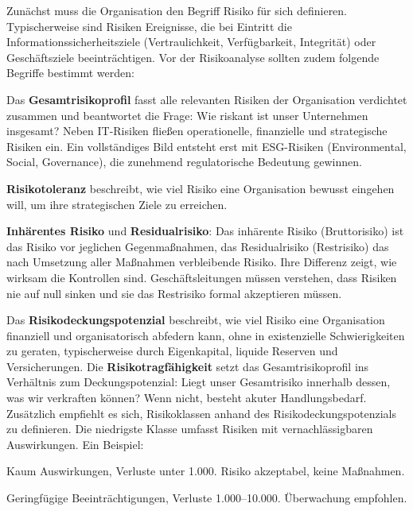 Zunächst muss die Organisation den Begriff Risiko für sich definieren. Typischerweise sind Risiken Ereignisse, die bei Eintritt die Informationssicherheitsziele (Vertraulichkeit, Verfügbarkeit, Integrität) oder Geschäftsziele beeinträchtigen. Vor der Risikoanalyse sollten zudem folgende Begriffe bestimmt werden:

Das \textbf{Gesamtrisikoprofil} fasst alle relevanten Risiken der Organisation verdichtet zusammen und beantwortet die Frage: Wie riskant ist unser Unternehmen insgesamt? Neben IT-Risiken fließen operationelle, finanzielle und strategische Risiken ein. Ein vollständiges Bild entsteht erst mit ESG-Risiken (Environmental, Social, Governance), die zunehmend regulatorische Bedeutung gewinnen.

\textbf{Risikotoleranz} beschreibt, wie viel Risiko eine Organisation bewusst eingehen will, um ihre strategischen Ziele zu erreichen.

\textbf{Inhärentes Risiko} und \textbf{Residualrisiko}: Das inhärente Risiko (Bruttorisiko) ist das Risiko vor jeglichen Gegenmaßnahmen, das Residualrisiko (Restrisiko) das nach Umsetzung aller Maßnahmen verbleibende Risiko. Ihre Differenz zeigt, wie wirksam die Kontrollen sind. Geschäftsleitungen müssen verstehen, dass Risiken nie auf null sinken und sie das Restrisiko formal akzeptieren müssen.

Das \textbf{Risikodeckungspotenzial} beschreibt, wie viel Risiko eine Organisation finanziell und organisatorisch abfedern kann, ohne in existenzielle Schwierigkeiten zu geraten, typischerweise durch Eigenkapital, liquide Reserven und Versicherungen. Die \textbf{Risikotragfähigkeit} setzt das Gesamtrisikoprofil ins Verhältnis zum Deckungspotenzial: Liegt unser Gesamtrisiko innerhalb dessen, was wir verkraften können? Wenn nicht, besteht akuter Handlungsbedarf.
\newpage
Zusätzlich empfiehlt es sich, Risikoklassen anhand des Risikodeckungspotenzials zu definieren. Die niedrigste Klasse umfasst Risiken mit vernachlässigbaren Auswirkungen. Ein Beispiel:


\begin{tcolorbox}[title=Klasse 1: Minimal]
Kaum Auswirkungen, Verluste unter 1.000\texteuro. Risiko akzeptabel, keine Maßnahmen.
\end{tcolorbox}

\begin{tcolorbox}[title=Klasse 2: Niedrig]
Geringfügige Beeinträchtigungen, Verluste 1.000–10.000\texteuro. Überwachung empfohlen.
\end{tcolorbox}

